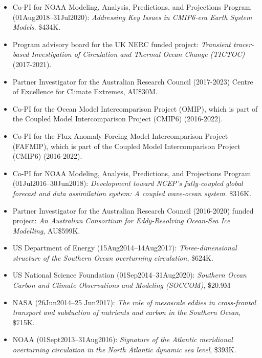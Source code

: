 \documentclass{article}
\begin{document}
\begin{itemize}[leftmargin=*]
\item Co-PI for NOAA Modeling, Analysis, Predictions, and Projections Program (01Aug2018--31Jul2020): {\it Addressing Key Issues in CMIP6-era Earth System Models}. \$434K.
    
\item Program advisory board for the UK NERC funded project: {\it Transient tracer-based Investigation of Circulation and Thermal Ocean Change (TICTOC)} (2017-2021).

\item Partner Investigator for the Australian Research Council (2017-2023) Centre of Excellence for Climate Extremes, AU\$30M.
  
\item Co-PI for the Ocean Model Intercomparison Project (OMIP), which is part of the Coupled Model Intercomparison Project (CMIP6) (2016-2022).    

\item Co-PI for the Flux Anomaly Forcing Model Intercomparison Project (FAFMIP), which is part of the Coupled Model Intercomparison Project (CMIP6) (2016-2022).    

\item Co-PI for NOAA Modeling, Analysis, Predictions, and Projections Program (01Jul2016--30Jun2018): {\it Development toward NCEP's fully-coupled global forecast and data assimilation system: A coupled wave-ocean system}.  \$316K.

\item Partner Investigator for the  Australian Research Council (2016-2020) funded project: {\it An Australian Consortium for Eddy-Resolving Ocean-Sea Ice Modelling}, AU\$599K.

\item US Department of Energy (15Aug2014--14Aug2017): {\it Three-dimensional structure of the Southern Ocean overturning circulation},  \$624K.

\item US National Science Foundation (01Sep2014--31Aug2020): {\it Southern Ocean Carbon and Climate Observations and Modeling (SOCCOM)}, \$20.9M

\item NASA (26Jun2014--25 Jun2017): {\it The role of mesoscale eddies in cross-frontal transport and subduction of nutrients and carbon in the Southern Ocean}, \$715K.

\item NOAA (01Sept2013--31Aug2016): {\it Signature of the Atlantic meridional overturning circulation in the North Atlantic dynamic sea level}, \$393K.


\end{itemize}
\end{document}
